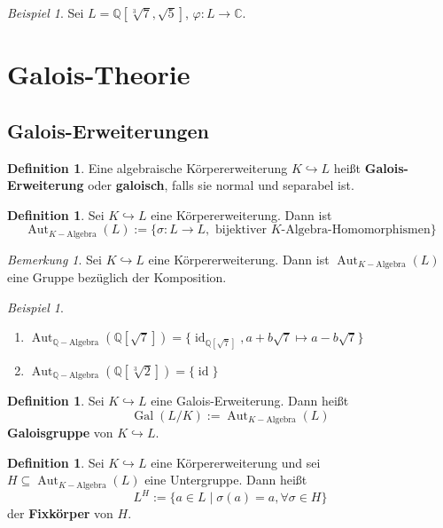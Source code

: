 \documentclass[10pt,a4paper]{article}
\newcommand{\Q}{\ensuremath{\mathbb{Q}}}
\newcommand{\C}{\ensuremath{\mathbb{C}}}
\newcommand{\Aut}{\operatorname{Aut}}
\newcommand{\id}{\operatorname{id}}
\newcommand{\Gal}{\ensuremath{\operatorname{Gal}}}
\newcounter{thm}[section]
\theoremstyle{definition}
\newtheorem{definition}[thm]{Definition}
\theoremstyle{plain}
\theoremstyle{remark}
\newtheorem*{bem*}{Bemerkung}
\newtheorem{exm}[thm]{Beispiel}
\newtheorem*{exm*}{Beispiel}
\begin{document}
\addtocounter{thm}{-1}
\begin{exm}
	Sei $L=\Q[\sqrt[3]{7},\sqrt{5}]$, $\varphi:L\rightarrow \C$.
\end{exm}






\section{Galois-Theorie}
\subsection{Galois-Erweiterungen}


\begin{definition}
	Eine algebraische Körpererweiterung $K\hookrightarrow L$ heißt \textbf{Galois-Erweiterung} oder \textbf{galoisch}, falls sie normal und separabel ist.
\end{definition}

\begin{definition}
	Sei $K\hookrightarrow L$ eine Körpererweiterung. Dann ist
	\[\Aut_{K-\text{Algebra}}(L):=\{\sigma:L\rightarrow L,\text{ bijektiver $K$-Algebra-Homomorphismen}\}\]
\end{definition}
\begin{bem*}
	Sei $K\hookrightarrow L$ eine Körpererweiterung. Dann ist $\Aut_{K-\text{Algebra}}(L)$ eine Gruppe bezüglich der Komposition.
\end{bem*}


\begin{exm*}
	\begin{enumerate}
		\item $\Aut_{\Q-\text{Algebra}}(\Q[\sqrt{7}])=\{\id_{\Q[\sqrt{7}]},a+b\sqrt{7}\mapsto a-b\sqrt{7}\}$
		\item $\Aut_{\Q-\text{Algebra}}(\Q[\sqrt[3]{2}])=\{\id\}$
	\end{enumerate}
\end{exm*}

\addtocounter{thm}{-1}
\begin{definition}
	Sei $K\hookrightarrow L$ eine Galois-Erweiterung. Dann heißt
	\[\Gal(L/K):=\Aut_{K-\text{Algebra}}(L)\]
	\textbf{Galoisgruppe} von $K\hookrightarrow L$.
\end{definition}
\begin{definition}
	Sei $K\hookrightarrow L$ eine Körpererweiterung und sei $H\subseteq \Aut_{K-\text{Algebra}}(L)$ eine Untergruppe. Dann heißt\[L^H:=\{a\in L\mid\sigma(a)=a,\forall\sigma\in H\}\]
	 der \textbf{Fixkörper} von $H$.
\end{definition}
\end{document}
